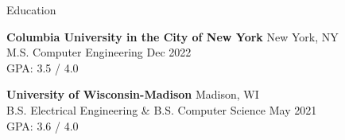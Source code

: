 \documentclass{resume} %
\begin{document}
  \newcommand\LineShrinkBeforeItem{\vspace*{-1.5em}}


  \begin{rSection}{Education}

    {\bf Columbia University in the City of New York} \hfill {New York, NY}\\
    M.S. Computer Engineering  \hfill {Dec 2022}\\
    GPA: 3.5 / 4.0

    {\bf University of Wisconsin-Madison} \hfill {Madison, WI}\\
    B.S. Electrical Engineering \& B.S. Computer Science  \hfill {May 2021}\\
    GPA: 3.6 / 4.0

  \end{rSection}

\end{document}
